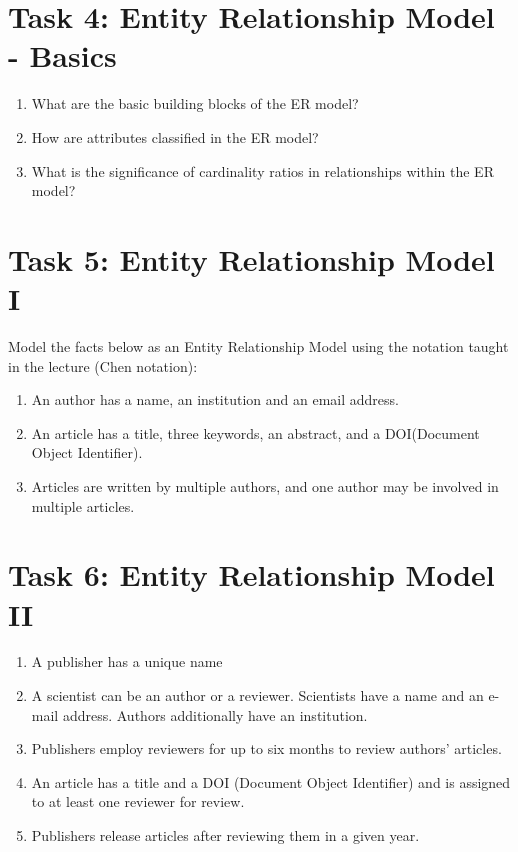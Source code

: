\documentclass{article}
\begin{document}

\section*{Task 4: Entity Relationship Model - Basics}
\begin{enumerate}
\item What are the basic building blocks of the ER model?

\item How are attributes classified in the ER model?

\item What is the significance of cardinality ratios in relationships within the ER model?
\end{enumerate}



\section*{Task 5: Entity Relationship Model I}
Model the facts below as an Entity Relationship Model using the notation taught in the lecture (Chen notation):

\begin{enumerate}
\item An author has a name, an institution and an email address.

\item An article has a title, three keywords, an abstract, and a DOI(Document Object Identifier).

\item Articles are written by multiple authors, and one author may be involved in multiple articles.
\end{enumerate}



\section*{Task 6: Entity Relationship Model II}
\begin{enumerate}
\item A publisher has a unique name

\item A scientist can be an author or a reviewer. Scientists have a name and an e-mail address.
Authors additionally have an institution.

\item Publishers employ reviewers for up to six months to review authors’ articles.

\item An article has a title and a DOI (Document Object Identifier) and is assigned to at least one
reviewer for review.

\item Publishers release articles after reviewing them in a given year.
\end{enumerate}
\end{document}
